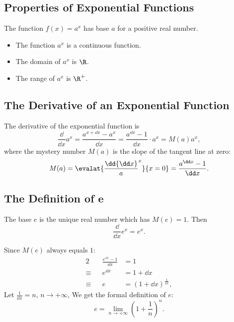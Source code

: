 \subsection{Properties of Exponential Functions}
The function $f(x)=a^x$ has base $a$ for a positive real number.
\begin{itemize}
\item The function $a^x$ is a continuous function.
\item The domain of $a^x$ is $\R$.
\item The range of $a^x$ is $\R^+$.
\end{itemize}

\subsection{The Derivative of an Exponential Function}
The derivative of the exponential function is
\[
\frac\dd{\dd x}a^x=\frac{a^{x+\dd x}-a^x}{\dd x}=\frac{a^{\dd x}-1}{\dd x}\cdot a^x=M(a)a^x,
\]
where the mystery number $M(a)$ is the slope of the tangent line at zero:
\[M(a)=\evalat{\frac\dd{\dd x}a^x}{x=0}=\frac{a^{\dd x}-1}{\dd x}.\]

\subsection{The Definition of $\bm e$}
The base $e$ is the unique real number which has $M(e)=1$. Then
\[\frac\dd{\dd x}e^x=e^x.\]

Since $M(e)$ always equals $1$:
\begin{alignat*}{2}
         && \frac{e^{\dd x} -1}{\dd x} & =1\\
  \equiv &&                  e^{\dd x} & =1+\dd x\\
  \equiv &&                          e & =(1+\dd x)^{\frac{1}{\dd x}},
\end{alignat*}
Let $\frac1{\dd x}=n$, $n\to+\infty$, We get the formal definition of $e$:
\[e=\lim_{n\to+\infty}(1+\frac{1}{n})^n.\]

